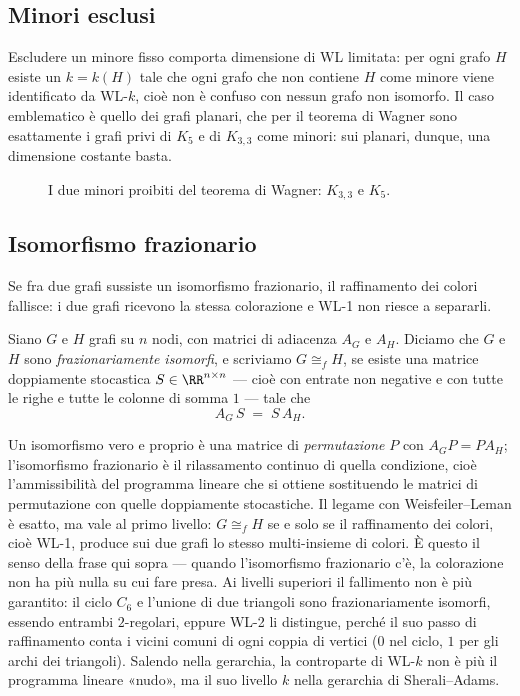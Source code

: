 \subsection{Minori esclusi}

Escludere un minore fisso comporta dimensione di WL limitata: per ogni grafo $H$ esiste
un $k = k(H)$ tale che ogni grafo che non contiene $H$ come minore viene identificato da
WL-$k$, cioè non è confuso con nessun grafo non isomorfo. Il caso emblematico è quello
dei grafi planari, che per il teorema di Wagner sono esattamente i grafi privi di $K_5$ e
di $K_{3,3}$ come minori: sui planari, dunque, una dimensione costante basta.

\begin{figure}[H]
  \centering
  
  \caption{I due minori proibiti del teorema di Wagner: $K_{3,3}$ e $K_5$.}
  \label{fig:minori-esclusi}
\end{figure}

\subsection{Isomorfismo frazionario}


Se fra due grafi sussiste un isomorfismo frazionario, il raffinamento dei colori
fallisce: i due grafi ricevono la stessa colorazione e WL-1 non riesce a separarli.

\begin{definizione}
  Siano $G$ e $H$ grafi su $n$ nodi, con matrici di adiacenza $A_G$ e $A_H$. Diciamo che
  $G$ e $H$ sono \emph{frazionariamente isomorfi}, e scriviamo $G \cong_f H$, se esiste
  una matrice doppiamente stocastica $S \in \RR^{n \times n}$ --- cioè con entrate non
  negative e con tutte le righe e tutte le colonne di somma $1$ --- tale che
  \[
    A_G\,S \;=\; S\,A_H .
  \]
\end{definizione}

\begin{osservazione}
  Un isomorfismo vero e proprio è una matrice di \emph{permutazione} $P$ con
  $A_G P = P A_H$; l'isomorfismo frazionario è il rilassamento continuo di quella
  condizione, cioè l'ammissibilità del programma lineare che si ottiene sostituendo le
  matrici di permutazione con quelle doppiamente stocastiche. Il legame con
  Weisfeiler--Leman è esatto, ma vale al primo livello: $G \cong_f H$ se e solo se il
  raffinamento dei colori, cioè WL-1, produce sui due grafi lo stesso multi-insieme di
  colori. È questo il senso della frase qui sopra --- quando l'isomorfismo frazionario
  c'è, la colorazione non ha più nulla su cui fare presa. Ai livelli superiori il
  fallimento non è più garantito: il ciclo $C_6$ e l'unione di due triangoli sono
  frazionariamente isomorfi, essendo entrambi $2$-regolari, eppure WL-2 li distingue,
  perché il suo passo di raffinamento conta i vicini comuni di ogni coppia di vertici
  ($0$ nel ciclo, $1$ per gli archi dei triangoli). Salendo nella gerarchia, la
  controparte di WL-$k$ non è più il programma lineare «nudo», ma il suo livello $k$
  nella gerarchia di Sherali--Adams.
\end{osservazione}

